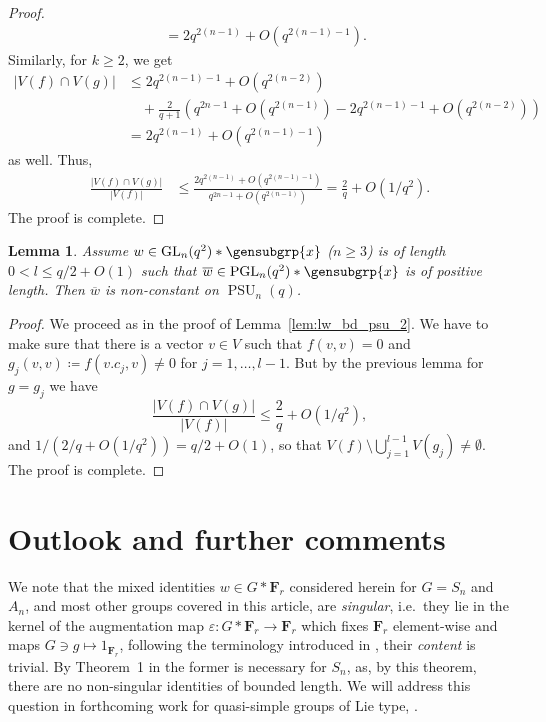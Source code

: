 \documentclass[a4paper,11pt]{amsproc}
\newcommand{\card}[1]{\left\lvert#1\right\rvert}%
\DeclareMathOperator{\PSU}{PSU}%
\newcommand{\freegrp}{\mathbf F}%
\DeclareMathOperator{\GL}{GL}%
\DeclareMathOperator{\PGL}{PGL}%
\theoremstyle{plain}
\newtheorem{lemma}{Lemma}[section]
\theoremstyle{definition}
\begin{document}
\begin{proof}
\begin{align*}
			&=2q^{2(n-1)}+O(q^{2(n-1)-1}).
		\end{align*}
		Similarly, for $k\geq 2$, we get
		\begin{align*}
			\card{V(f)\cap V(g)}
			&\leq 2q^{2(n-1)-1}+O(q^{2(n-2)})\\
			&\quad +\frac{2}{q+1}(q^{2n-1}+O(q^{2(n-1)})-2q^{2(n-1)-1}+O(q^{2(n-2)}))\\
			&=2q^{2(n-1)}+O(q^{2(n-1)-1})
		\end{align*}
		as well.
		Thus,
		\begin{align*}
			\frac{\card{V(f)\cap V(g)}}{\card{V(f)}}
			&\leq\frac{2q^{2(n-1)}+O(q^{2(n-1)-1})}{q^{2n-1}+O(q^{2(n-1)})}=\frac{2}{q}+O(1/q^2).
		\end{align*}
		The proof is complete.
	\end{proof}
	
	\begin{lemma}\label{lem:lw_bd_psu_n}
		Assume $w\in\GL_n(q^2)\ast\gensubgrp{x}$ ($n\geq 3$) is of length $0<l\leq q/2+O(1)$ such that $\overline{w}\in\PGL_n(q^2)\ast\gensubgrp{x}$ is of positive length. Then $\overline{w}$ is non-constant on $\PSU_n(q)$.
	\end{lemma}
	
	\begin{proof}
		We proceed as in the proof of Lemma~\ref{lem:lw_bd_psu_2}. We have to make sure that there is a vector $v\in V$ such that $f(v,v)=0$ and $g_j(v,v)\coloneqq f(v.c_j,v)\neq 0$ for $j=1,\ldots,l-1$. But by the previous lemma for $g=g_j$ we have
		$$
		\frac{\card{V(f)\cap V(g)}}{\card{V(f)}}\leq\frac{2}{q}+O(1/q^2),  
		$$
		and $1/(2/q+O(1/q^2))=q/2+O(1)$, so that $V(f)\setminus\bigcup_{j=1}^{l-1}{V(g_j)}\neq\emptyset$. The proof is complete.
	\end{proof}
	
	\section{Outlook and further comments} \label{comments}
	
	We note that the mixed identities $w\in G\ast\freegrp_r$ considered herein for $G=S_n$ and $A_n$, and most other groups covered in this article, are \emph{singular}, i.e.\ they lie in the kernel of the augmentation map $\varepsilon\colon G\ast\freegrp_r\to\freegrp_r$ which fixes $\freegrp_r$ element-wise and maps $G\ni g\mapsto 1_{\freegrp_r}$, following the terminology introduced in \cite{klyachkothom2017new}, their \emph{content} is trivial. By Theorem~1 in \cite{schneiderthom2022word} the former is necessary for $S_n$, as, by this theorem, there are no non-singular identities of bounded length. We will address this question in forthcoming work for quasi-simple groups of Lie type, \cite{bradford2023nonsingular}.
	
\end{document}
